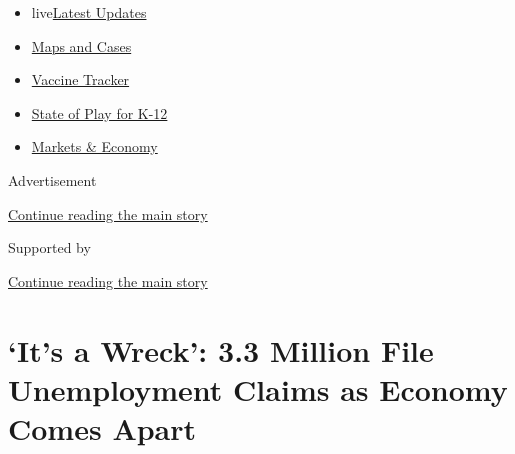 \begin{itemize}
\tightlist
\item
  live\href{https://www.nytimes3xbfgragh.onion/2020/08/17/world/coronavirus-covid.html?name=styln-coronavirus-markets\&region=TOP_BANNER\&variant=undefined\&block=storyline_menu_recirc\&action=click\&pgtype=Article\&impression_id=10d629c0-e0fd-11ea-9543-ff538f7d3baa}{Latest
  Updates}
\item
  \href{https://www.nytimes3xbfgragh.onion/interactive/2020/us/coronavirus-us-cases.html?name=styln-coronavirus-markets\&region=TOP_BANNER\&variant=undefined\&block=storyline_menu_recirc\&action=click\&pgtype=Article\&impression_id=10d629c1-e0fd-11ea-9543-ff538f7d3baa}{Maps
  and Cases}
\item
  \href{https://www.nytimes3xbfgragh.onion/interactive/2020/science/coronavirus-vaccine-tracker.html?name=styln-coronavirus-markets\&region=TOP_BANNER\&variant=undefined\&block=storyline_menu_recirc\&action=click\&pgtype=Article\&impression_id=10d629c2-e0fd-11ea-9543-ff538f7d3baa}{Vaccine
  Tracker}
\item
  \href{https://www.nytimes3xbfgragh.onion/2020/08/17/us/k-12-schools-reopening.html?name=styln-coronavirus-markets\&region=TOP_BANNER\&variant=undefined\&block=storyline_menu_recirc\&action=click\&pgtype=Article\&impression_id=10d629c3-e0fd-11ea-9543-ff538f7d3baa}{State
  of Play for K-12}
\item
  \href{https://www.nytimes3xbfgragh.onion/live/2020/08/17/business/stock-market-today-coronavirus?name=styln-coronavirus-markets\&region=TOP_BANNER\&variant=undefined\&block=storyline_menu_recirc\&action=click\&pgtype=Article\&impression_id=10d650d0-e0fd-11ea-9543-ff538f7d3baa}{Markets
  \& Economy}
\end{itemize}

Advertisement

\protect\hyperlink{after-top}{Continue reading the main story}

Supported by

\protect\hyperlink{after-sponsor}{Continue reading the main story}

\hypertarget{its-a-wreck-33-million-file-unemployment-claims-as-economy-comes-apart}{%
\section{`It's a Wreck': 3.3 Million File Unemployment Claims as Economy
Comes
Apart}\label{its-a-wreck-33-million-file-unemployment-claims-as-economy-comes-apart}}

